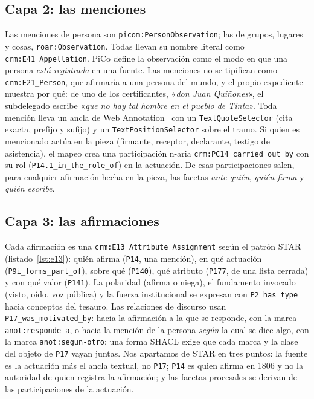\documentclass[runningheads]{llncs}
\newcommand{\ttt}[1]{\texttt{\small #1}}
\newcommand{\cita}[1]{«\textit{#1}»}
\begin{document}
\subsection{Capa 2: las menciones}
Las menciones de persona son \ttt{picom:PersonObservation}; las de grupos, lugares y cosas,
\ttt{roar:Observation}. Todas llevan su nombre literal como \ttt{crm:E41\_Appellation}. PiCo define la observación como el modo en que una persona
\emph{está registrada} en una fuente. Las menciones no se tipifican como \ttt{crm:E21\_Person}, que afirmaría a una
persona del mundo, y el propio expediente muestra por qué: de uno de los certificantes, \cita{don Juan Quiñones},
el subdelegado escribe \cita{que no hay tal hombre en el pueblo de Tinta}. Toda mención lleva un ancla de Web
Annotation~\cite{webannotation} con un \ttt{TextQuoteSelector} (cita exacta, prefijo y sufijo) y un
\ttt{TextPositionSelector} sobre el tramo. Si quien es mencionado actúa en la pieza (firmante, receptor, declarante,
testigo de asistencia), el mapeo crea una participación n-aria \ttt{crm:PC14\_carried\_out\_by} con su rol
(\ttt{P14.1\_in\_the\_role\_of}) en la actuación. De esas participaciones salen, para cualquier afirmación hecha en
la pieza, las facetas \emph{ante quién}, \emph{quién firma} y \emph{quién escribe}.

\subsection{Capa 3: las afirmaciones}
Cada afirmación es una \ttt{crm:E13\_Attribute\_Assignment} según el patrón STAR~\cite{andrews2025star}
(listado~\ref{lst:e13}): quién afirma (\ttt{P14}, una mención), en qué actuación (\ttt{P9i\_forms\_part\_of}), sobre
qué (\ttt{P140}), qué atributo (\ttt{P177}, de una lista cerrada) y con qué valor (\ttt{P141}). La polaridad (afirma o
niega), el fundamento invocado (visto, oído, voz pública) y la fuerza institucional se expresan con
\ttt{P2\_has\_type} hacia conceptos del tesauro. Las relaciones de discurso usan \ttt{P17\_was\_motivated\_by}: hacia
la afirmación a la que se responde, con la marca \ttt{anot:responde-a}, o hacia la mención de la persona \emph{según}
la cual se dice algo, con la marca \ttt{anot:segun-otro}; una forma SHACL exige que cada marca y la clase del objeto
de \ttt{P17} vayan juntas. Nos apartamos de STAR en tres puntos: la fuente es la actuación más el ancla textual, no
\ttt{P17}; \ttt{P14} es quien afirma en 1806 y no la autoridad de quien registra la afirmación; y las facetas
procesales se derivan de las participaciones de la actuación.
\end{document}
